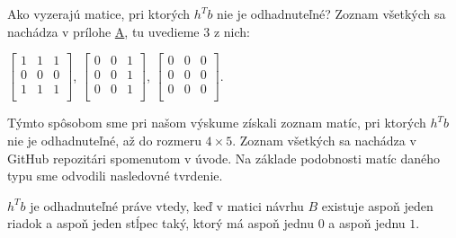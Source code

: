 Ako vyzerajú matice, pri ktorých $h^T b$ nie je odhadnuteľné? Zoznam všetkých sa nachádza v prílohe \hyperref[appendix:a]{A}, tu uvedieme $3$ z nich:

\begin{center}
$
\begin{bmatrix}
1 & 1 & 1 \\
0 & 0 & 0 \\
1 & 1 & 1 \\
\end{bmatrix}
$, 
$
\begin{bmatrix}
0 & 0 & 1 \\
0 & 0 & 1 \\
0 & 0 & 1 \\
\end{bmatrix}
$, 
$
\begin{bmatrix}
0 & 0 & 0 \\
0 & 0 & 0 \\
0 & 0 & 0 \\
\end{bmatrix}
$.
\end{center}

Týmto spôsobom sme pri našom výskume získali zoznam matíc, pri ktorých $h^T b$ nie je odhadnuteľné, až do rozmeru $4 \times 5$.
Zoznam všetkých sa nachádza v GitHub repozitári spomenutom v úvode. 
Na základe podobnosti matíc daného typu sme odvodili nasledovné tvrdenie.

\begin{prop}
\label{statement 1}
$h^T b$ je odhadnuteľné práve vtedy, keď v matici návrhu $B$ existuje aspoň jeden riadok a aspoň jeden stĺpec taký,
ktorý má aspoň jednu $0$ a aspoň jednu $1$.
\end{prop}

